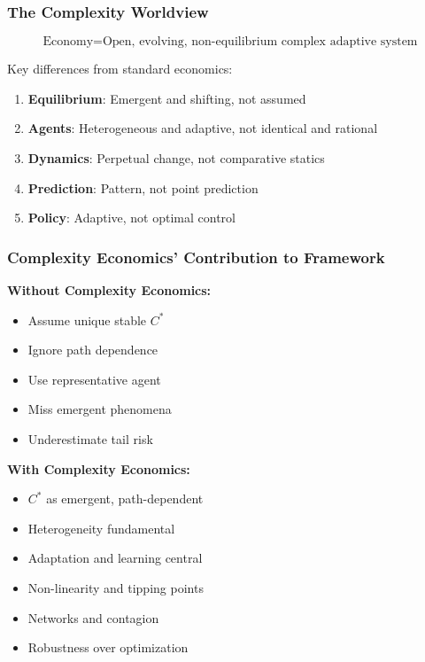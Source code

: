 \subsubsection{The Complexity Worldview}

\begin{equation}
\boxed{
\text{Economy} = \text{Open, evolving, non-equilibrium complex adaptive system}
}
\end{equation}

Key differences from standard economics:
\begin{enumerate}
    \item \textbf{Equilibrium}: Emergent and shifting, not assumed
    \item \textbf{Agents}: Heterogeneous and adaptive, not identical and rational
    \item \textbf{Dynamics}: Perpetual change, not comparative statics
    \item \textbf{Prediction}: Pattern, not point prediction
    \item \textbf{Policy}: Adaptive, not optimal control
\end{enumerate}

\subsubsection{Complexity Economics' Contribution to Framework}

\textbf{Without Complexity Economics:}
\begin{itemize}
    \item Assume unique stable $C^*$
    \item Ignore path dependence
    \item Use representative agent
    \item Miss emergent phenomena
    \item Underestimate tail risk
\end{itemize}

\textbf{With Complexity Economics:}
\begin{itemize}
    \item $C^*$ as emergent, path-dependent
    \item Heterogeneity fundamental
    \item Adaptation and learning central
    \item Non-linearity and tipping points
    \item Networks and contagion
    \item Robustness over optimization
\end{itemize}

